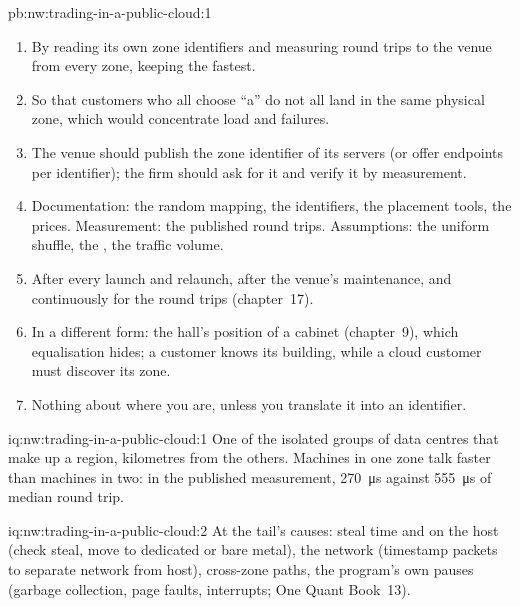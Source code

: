 \begin{solution}{pb:nw:trading-in-a-public-cloud:1}
\begin{enumerate}[resume]
\item By reading its own zone identifiers and measuring round trips to the venue from every zone, keeping the fastest.
\item So that customers who all choose ``a'' do not all land in the same physical zone, which would concentrate load and failures.
\item The venue should publish the zone identifier of its servers (or offer endpoints per identifier); the firm should ask for it and verify it by
  measurement.
\item Documentation: the random mapping, the identifiers, the placement tools, the prices. Measurement: the published round trips. Assumptions: the
  uniform shuffle, the , the traffic volume.
\item After every launch and relaunch, after the venue's maintenance, and continuously for the round trips (chapter~17).
\item In a different form: the hall's position of a cabinet (chapter~9), which equalisation hides; a  customer knows its building, while a
  cloud customer must discover its zone.
\item Nothing about where you are, unless you translate it into an identifier.
\end{enumerate}
\end{solution}

\begin{solution}{iq:nw:trading-in-a-public-cloud:1}
One of the isolated groups of data centres that make up a region, kilometres from the others. Machines in one zone talk faster than machines in two:
in the published measurement, \qty{270}{\micro\second} against \qty{555}{\micro\second} of median round trip.
\end{solution}

\begin{solution}{iq:nw:trading-in-a-public-cloud:2}
At the tail's causes: steal time and  on the host (check steal, move to dedicated or bare metal), the network (timestamp packets to
separate network from host), cross-zone paths, the program's own pauses (garbage collection, page faults, interrupts; One Quant Book~13).
\end{solution}

